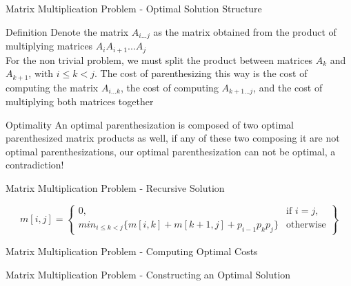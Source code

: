 \begin{frame}{Matrix Multiplication Problem - Optimal Solution Structure}
  \begin{block}{Definition}
   Denote the matrix $A_{i...j}$ as the matrix obtained from the product
   of multiplying matrices $A_{i}A_{i+1}...A_{j}$ \\
  \vspace{0.5em}
  For the non trivial problem, we must split the product between matrices $A_k$ and $A_{k+1}$,
  with $ i \leq k < j$. The cost of parenthesizing this way is the cost
  of computing the matrix $A_{i...k}$, the cost of computing $A_{k+1...j}$,
  and the cost of multiplying both matrices together
  \end{block}

  \pause
  \begin{alertblock}{Optimality}
    An optimal parenthesization is composed of two optimal parenthesized matrix products as well,
    if any of these two composing it are not optimal parenthesizations, our optimal parenthesization can not be optimal,
    a contradiction!
  \end{alertblock}
\end{frame}

\begin{frame}{Matrix Multiplication Problem - Recursive Solution}
  
    \[
    m[i,j] = \left\{\begin{array}{lr}
      0, & \text{if } i = j,\\
      min_{i \leq k < j} \{m[i,k] + m[k + 1, j] + p_{i-1}p_{k}p_{j}\} & \text{otherwise}
      \end{array}\right\}
    \]
  
\end{frame}

\begin{frame}{Matrix Multiplication Problem - Computing Optimal Costs}
  
\end{frame}

\begin{frame}{Matrix Multiplication Problem - Constructing an Optimal Solution}
  
\end{frame}